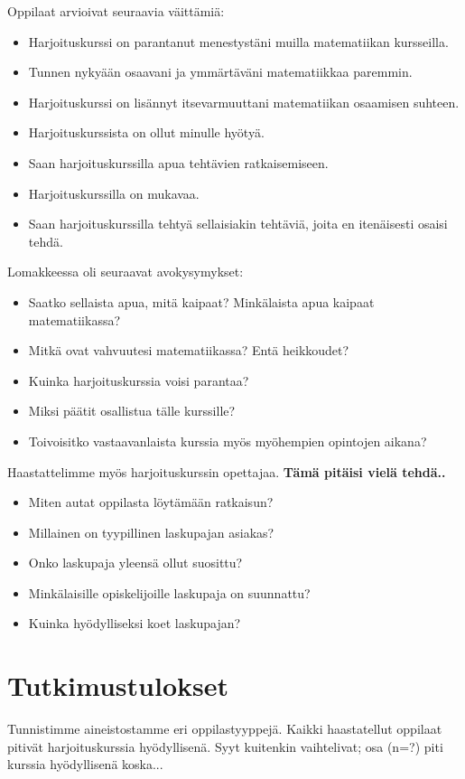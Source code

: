 \documentclass[a4paper,12pt,leqno,titlepage]{article}
\begin{document}
Oppilaat arvioivat seuraavia väittämiä:
\begin{itemize}
\item Harjoituskurssi on parantanut menestystäni muilla matematiikan kursseilla.
\item Tunnen nykyään osaavani ja ymmärtäväni matematiikkaa paremmin.
\item Harjoituskurssi on lisännyt itsevarmuuttani matematiikan osaamisen suhteen.
\item Harjoituskurssista on ollut minulle hyötyä.
\item Saan harjoituskurssilla apua tehtävien ratkaisemiseen.
\item Harjoituskurssilla on mukavaa.
\item Saan harjoituskurssilla tehtyä sellaisiakin tehtäviä, joita en itenäisesti osaisi tehdä.
\end{itemize}
Lomakkeessa oli seuraavat avokysymykset:
\begin{itemize}
\item Saatko sellaista apua, mitä kaipaat? Minkälaista apua kaipaat matematiikassa?
\item Mitkä ovat vahvuutesi matematiikassa? Entä heikkoudet?
\item Kuinka harjoituskurssia voisi parantaa?
\item Miksi päätit osallistua tälle kurssille?
\item Toivoisitko vastaavanlaista kurssia myös myöhempien opintojen aikana?
\end{itemize}

Haastattelimme myös harjoituskurssin opettajaa.
\textbf{Tämä pitäisi vielä tehdä..}
\begin{itemize}
\item Miten autat oppilasta löytämään ratkaisun?
\item Millainen on tyypillinen laskupajan asiakas?
\item Onko laskupaja yleensä ollut suosittu?
\item Minkälaisille opiskelijoille laskupaja on suunnattu?
\item Kuinka hyödylliseksi koet laskupajan?
\end{itemize}

\section{Tutkimustulokset}
Tunnistimme aineistostamme eri oppilastyyppejä.
Kaikki haastatellut oppilaat pitivät harjoituskurssia hyödyllisenä.
Syyt kuitenkin vaihtelivat; osa (n=?) piti kurssia hyödyllisenä koska...
\end{document}
